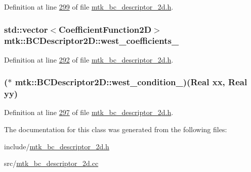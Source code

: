 Definition at line \hyperlink{mtk__bc__descriptor__2d_8h_source_l00299}{299} of file \hyperlink{mtk__bc__descriptor__2d_8h_source}{mtk\+\_\+bc\+\_\+descriptor\+\_\+2d.\+h}.

\hypertarget{classmtk_1_1BCDescriptor2D_a7df71b43acc25c468683075cc7790bb2}{
\subsubsection[{west\+\_\+coefficients\+\_\+}]{\setlength{\rightskip}{0pt plus 5cm}std\+::vector$<${\bf Coefficient\+Function2\+D}$>$ mtk\+::\+B\+C\+Descriptor2\+D\+::west\+\_\+coefficients\+\_\+\hspace{0.3cm}{\ttfamily [private]}}}\label{classmtk_1_1BCDescriptor2D_a7df71b43acc25c468683075cc7790bb2}


Definition at line \hyperlink{mtk__bc__descriptor__2d_8h_source_l00292}{292} of file \hyperlink{mtk__bc__descriptor__2d_8h_source}{mtk\+\_\+bc\+\_\+descriptor\+\_\+2d.\+h}.

\hypertarget{classmtk_1_1BCDescriptor2D_a2d4af48b3408658c7ace6eeb74464c9f}{
\subsubsection[{west\+\_\+condition\+\_\+}]{($\ast$ mtk\+::\+B\+C\+Descriptor2\+D\+::west\+\_\+condition\+\_\+)({\bf Real} xx, {\bf Real} yy)\hspace{0.3cm}{\ttfamily [private]}}}\label{classmtk_1_1BCDescriptor2D_a2d4af48b3408658c7ace6eeb74464c9f}


Definition at line \hyperlink{mtk__bc__descriptor__2d_8h_source_l00297}{297} of file \hyperlink{mtk__bc__descriptor__2d_8h_source}{mtk\+\_\+bc\+\_\+descriptor\+\_\+2d.\+h}.



The documentation for this class was generated from the following files\+:\begin{DoxyCompactItemize}
\item 
include/\hyperlink{mtk__bc__descriptor__2d_8h}{mtk\+\_\+bc\+\_\+descriptor\+\_\+2d.\+h}\item 
src/\hyperlink{mtk__bc__descriptor__2d_8cc}{mtk\+\_\+bc\+\_\+descriptor\+\_\+2d.\+cc}\end{DoxyCompactItemize}
